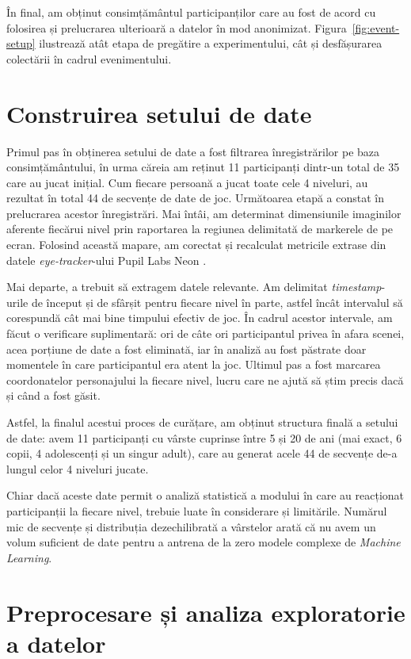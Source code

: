 În final, am obținut consimțământul participanților care au fost de acord cu folosirea și prelucrarea ulterioară a datelor în mod anonimizat. Figura~\ref{fig:event-setup} ilustrează atât etapa de pregătire a experimentului, cât și desfășurarea colectării în cadrul evenimentului.

\section{Construirea setului de date}

Primul pas în obținerea setului de date a fost filtrarea înregistrărilor pe baza consimțământului, în urma căreia am reținut 11 participanți dintr-un total de 35 care au jucat inițial. Cum fiecare persoană a jucat toate cele 4 niveluri, au rezultat în total 44 de secvențe de date de joc. Următoarea etapă a constat în prelucrarea acestor înregistrări. Mai întâi, am determinat dimensiunile imaginilor aferente fiecărui nivel prin raportarea la regiunea delimitată de markerele de pe ecran. Folosind această mapare, am corectat și recalculat metricile extrase din datele \emph{eye-tracker}-ului Pupil Labs Neon \cite{pupillabsneon}.

Mai departe, a trebuit să extragem datele relevante. Am delimitat \emph{timestamp}-urile de început și de sfârșit pentru fiecare nivel în parte, astfel încât intervalul să corespundă cât mai bine timpului efectiv de joc. În cadrul acestor intervale, am făcut o verificare suplimentară: ori de câte ori participantul privea în afara scenei, acea porțiune de date a fost eliminată, iar în analiză au fost păstrate doar momentele în care participantul era atent la joc. Ultimul pas a fost marcarea coordonatelor personajului la fiecare nivel, lucru care ne ajută să știm precis dacă și când a fost găsit.

Astfel, la finalul acestui proces de curățare, am obținut structura finală a setului de date: avem 11 participanți cu vârste cuprinse între 5 și 20 de ani (mai exact, 6 copii, 4 adolescenți și un singur adult), care au generat acele 44 de secvențe de-a lungul celor 4 niveluri jucate.

Chiar dacă aceste date permit o analiză statistică a modului în care au reacționat participanții la fiecare nivel, trebuie luate în considerare și limitările. Numărul mic de secvențe și distribuția dezechilibrată a vârstelor arată că nu avem un volum suficient de date pentru a antrena de la zero modele complexe de \emph{Machine Learning}.

\section{Preprocesare și analiza exploratorie a datelor}

